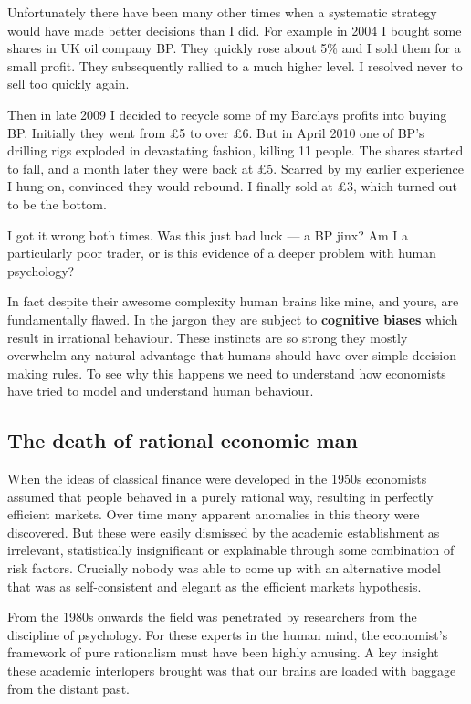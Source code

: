 Unfortunately there have been many other times when a systematic strategy would have made better decisions than I did. For example in 2004 I bought some shares in UK oil company BP. They quickly rose about 5\% and I sold them for a small profit. They subsequently rallied to a much higher level. I resolved never to sell too quickly again.

Then in late 2009 I decided to recycle some of my Barclays profits into buying BP. Initially they went from \pounds 5 to over \pounds 6. But in April 2010 one of BP's drilling rigs exploded in devastating fashion, killing 11 people. The shares started to fall, and a month later they were back at \pounds 5. Scarred by my earlier experience I hung on, convinced they would rebound. I finally sold at \pounds 3, which turned out to be the bottom.

I got it wrong both times. Was this just bad luck --- a BP jinx? Am I a particularly poor trader, or is this evidence of a deeper problem with human psychology?

In fact despite their awesome complexity human brains like mine, and yours, are fundamentally flawed. In the jargon they are subject to \textbf{cognitive biases} which result in irrational behaviour. These instincts are so strong they mostly overwhelm any natural advantage that humans should have over simple decision-making rules. To see why this happens we need to understand how economists have tried to model and understand human behaviour.

\subsection*{The death of rational economic man}

When the ideas of classical finance were developed in the 1950s economists assumed that people behaved in a purely rational way, resulting in perfectly efficient markets. Over time many apparent anomalies in this theory were discovered. But these were easily dismissed by the academic establishment as irrelevant, statistically insignificant or explainable through some combination of risk factors. Crucially nobody was able to come up with an alternative model that was as self-consistent and elegant as the efficient markets hypothesis.

From the 1980s onwards the field was penetrated by researchers from the discipline of psychology. For these experts in the human mind, the economist's framework of pure rationalism must have been highly amusing. A key insight these academic interlopers brought was that our brains are loaded with baggage from the distant past.

